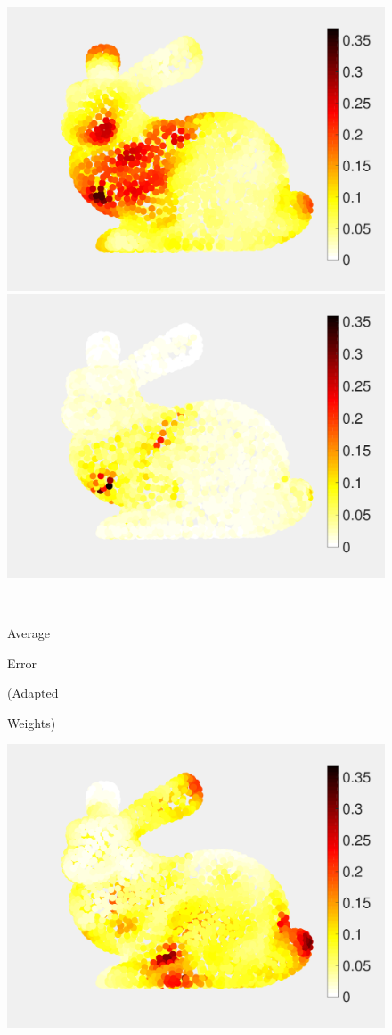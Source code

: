 \documentclass[journal, 10pt]{IEEEtran}
\begin{document}
{\begin{figure}[H]
\begin{minipage}[m]{0.4\linewidth}
\centerline{\includegraphics[width=.85\linewidth]{fig_rec_low_error}}
\end{minipage}
\begin{minipage}[m]{0.4\linewidth}
\centerline{\includegraphics[width=.85\linewidth]{fig_rec_band_error}}
\end{minipage} \\
\begin{minipage}[m]{0.16\linewidth}
\centerline{\small{Average}}
\centerline{\small{Error}}
\centerline{\small{(Adapted}}
\centerline{\small{Weights)}}
\end{minipage}
\begin{minipage}[m]{0.4\linewidth}
\centerline{\includegraphics[width=.85\linewidth]{fig_rec_low_error_adapted}}

\end{minipage}
\end{figure}}
\end{document}
